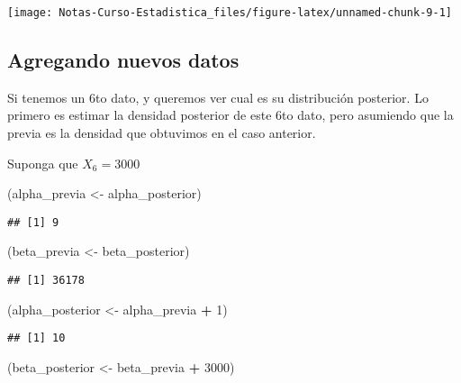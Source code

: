 \documentclass[
  12pt,
]{book}
\newenvironment{Shaded}{\begin{snugshade}}{\end{snugshade}}
\newcommand{\DecValTok}[1]{\textcolor[rgb]{0.00,0.00,0.81}{#1}}
\newcommand{\NormalTok}[1]{#1}
\newcommand{\OperatorTok}[1]{\textcolor[rgb]{0.81,0.36,0.00}{\textbf{#1}}}
\newcommand{\StringTok}[1]{\textcolor[rgb]{0.31,0.60,0.02}{#1}}
\begin{document}
\begin{center}\texttt{[image: Notas-Curso-Estadistica\_files/figure-latex/unnamed-chunk-9-1]} \end{center}

\hypertarget{agregando-nuevos-datos}{%
\subsection{Agregando nuevos datos}\label{agregando-nuevos-datos}}

Si tenemos un 6to dato, y queremos ver cual es su distribución posterior. Lo primero es estimar la densidad posterior de este 6to dato, pero asumiendo que la previa es la densidad que obtuvimos en el caso anterior.

Suponga que \(X_6 = 3000\)

\begin{Shaded}
\begin{Highlighting}[]
\NormalTok{(alpha\_previa \textless{}{-}}\StringTok{ }\NormalTok{alpha\_posterior)}
\end{Highlighting}
\end{Shaded}

\begin{verbatim}
## [1] 9
\end{verbatim}

\begin{Shaded}
\begin{Highlighting}[]
\NormalTok{(beta\_previa \textless{}{-}}\StringTok{ }\NormalTok{beta\_posterior)}
\end{Highlighting}
\end{Shaded}

\begin{verbatim}
## [1] 36178
\end{verbatim}

\begin{Shaded}
\begin{Highlighting}[]
\NormalTok{(alpha\_posterior \textless{}{-}}\StringTok{ }\NormalTok{alpha\_previa }\OperatorTok{+}\StringTok{ }\DecValTok{1}\NormalTok{)}
\end{Highlighting}
\end{Shaded}

\begin{verbatim}
## [1] 10
\end{verbatim}

\begin{Shaded}
\begin{Highlighting}[]
\NormalTok{(beta\_posterior \textless{}{-}}\StringTok{ }\NormalTok{beta\_previa }\OperatorTok{+}\StringTok{ }\DecValTok{3000}\NormalTok{)}
\end{Highlighting}
\end{Shaded}
\end{document}
